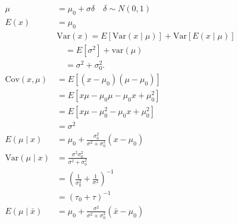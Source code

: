 \documentclass[12pt]{article}
\begin{document}
\begin{appendices}
\begin{equation*}
\begin{aligned}
   \mu &= \mu_0 + \sigma\delta \quad \delta \sim N(0, 1)\\
   E(x) &= \mu_0\\
   & \text{Var}(x) = E[\text{Var}(x \mid \mu)] + \text{Var}[E(x \mid \mu)] \\
   & \quad = E[\sigma^2] + \text{var}(\mu) \\
   & \quad = \sigma^2 + \sigma_0^2.\\
    \text{Cov}(x, \mu) &= E[(x - \mu_0)(\mu - \mu_0)] \\
    &= E[x\mu - \mu_0 \mu - \mu_0 x + \mu_0^2] \\
    &= E[x\mu - \mu_0^2 - \mu_0 x + \mu_0^2] \\
    &= \sigma^2 \\
    E(\mu \mid x) &= \mu_0 + \frac{\sigma_0^2}{\sigma^2 + \sigma_0^2}(x - \mu_0) \\
    \text{Var}(\mu \mid x) &= \frac{\sigma^2 \sigma_0^2}{\sigma^2 + \sigma_0^2} \\
    &= \left( \frac{1}{\sigma_0^2} + \frac{1}{\sigma^2} \right)^{-1} \\
    &= (\tau_0 + \tau)^{-1}\\
    E(\mu \mid \bar{x}) &= \mu_0 + \frac{\sigma^2}{\sigma^2 + \sigma_0^2}(\bar{x} - \mu_0)
\end{aligned}
\end{equation*}


\end{appendices}
\end{document}
